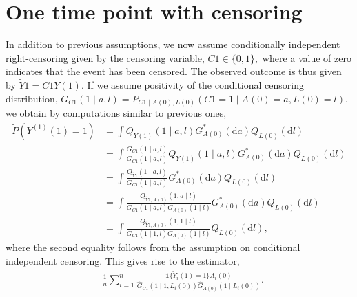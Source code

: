 \documentclass{article}
\newcommand{\A}{A}
\renewcommand{\L}{L}
\newcommand{\Y}{Y}
\newcommand{\C}{C}
\newcommand{\Ytilde}{\tilde{Y}}
\newcommand{\Ystar}[2]{Y^{(#1)}(#2)}
\newcommand{\Asubs}[2]{A_{#1}(#2)}
\newcommand{\Lsubs}[2]{L_{#1}(#2)}
\newcommand{\Ytsubs}[2]{\tilde{Y}_{#1}(#2)}
\renewcommand{\d}{\ensuremath{\mathrm{d}}}
\begin{document}
\section{One time point with censoring}
In addition to previous assumptions, we now assume conditionally independent right-censoring given by the censoring variable, $\C{1}\in\{0,1\},$ where a value of zero indicates that the event has been censored. The observed outcome is thus given by $\Ytilde{1}=\C{1}\Y(1)$. If we assume positivity of the conditional censoring distribution, $G_{\C{1}}(1\mid a,l)=P_{\C{1}\mid \A(0),\L(0)}(\C{1}=1\mid \A(0)=a, \L(0)=l)$, we obtain by computations similar to previous ones,
\begin{align*}
    \tilde{P}(\Ystar{1}{1}=1)&=\int Q_{\Y(1)}(1\mid a,l)G^*_{\A(0)}(\d a)Q_{\L(0)}(\d l)\\
    &=\int\frac{G_{\C{1}}(1\mid a,l)}{G_{\C{1}}(1\mid a,l)}Q_{\Y(1)}(1\mid a,l)G^*_{\A(0)}(\d a)Q_{\L(0)}(\d l)\\
    &=\int\frac{Q_{\Ytilde{1}}(1\mid a,l)}{G_{\C{1}}(1\mid a,l)}G^*_{\A(0)}(\d a)Q_{\L(0)}(\d l)\\
    &=\int\frac{Q_{\Ytilde{1},\A(0)}(1,a\mid l)}{G_{\C{1}}(1\mid a,l)G_{\A(0)}(1\mid l)}G^*_{\A(0)}(\d a)Q_{\L(0)}(\d l)\\
    &=\int\frac{Q_{\Ytilde{1},\A(0)}(1,1\mid l)}{G_{\C{1}}(1\mid 1,l)G_{\A(0)}(1\mid l)}Q_{\L(0)}(\d l),
\end{align*}
where the second equality follows from the assumption on conditional independent censoring. This gives rise to the estimator,
\begin{align*}
    &\frac{1}{n}\sum_{i=1}^n\frac{\mathds{1}\{\Ytsubs{i}{1}=1\}\Asubs{i}{0}}{\hat{G}_{\C{1}}(1\mid 1,\Lsubs{i}{0})\hat{G}_{\A(0)}(1\mid \Lsubs{i}{0})}.\tag{IPCW}
\end{align*}
\end{document}
